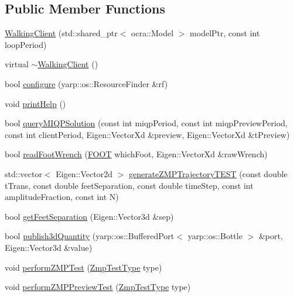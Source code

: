 \subsection*{\-Public \-Member \-Functions}
\begin{DoxyCompactItemize}
\item 
\hyperlink{classWalkingClient_a6c9002a44a54814c4b482739824e39aa}{\-Walking\-Client} (std\-::shared\-\_\-ptr$<$ ocra\-::\-Model $>$ model\-Ptr, const int loop\-Period)
\item 
virtual \hyperlink{classWalkingClient_a1dbc0308f844aea6542750104fddf8e2}{$\sim$\-Walking\-Client} ()
\item 
bool \hyperlink{classWalkingClient_adb8f972f34cb39c69c02a7c3cb493b81}{configure} (yarp\-::os\-::\-Resource\-Finder \&rf)
\item 
void \hyperlink{classWalkingClient_aff3fabef11d9c8b747a422f879c26067}{print\-Help} ()
\item 
bool \hyperlink{classWalkingClient_a06a0f21c6a921687f69f37f622338226}{query\-M\-I\-Q\-P\-Solution} (const int miqp\-Period, const int miqp\-Preview\-Period, const int client\-Period, \-Eigen\-::\-Vector\-Xd \&preview, \-Eigen\-::\-Vector\-Xd \&t\-Preview)
\item 
bool \hyperlink{classWalkingClient_a03ea2313c954a97aeb4d5b614f3e6caa}{read\-Foot\-Wrench} (\hyperlink{utils_8h_a4b6a8e135f90bd56e5a57a60efb42529}{\-F\-O\-O\-T} which\-Foot, \-Eigen\-::\-Vector\-Xd \&raw\-Wrench)
\item 
std\-::vector$<$ \-Eigen\-::\-Vector2d $>$ \hyperlink{classWalkingClient_a3185a8ede8bf8b1227f7dd540ba87e3c}{generate\-Z\-M\-P\-Trajectory\-T\-E\-S\-T} (const double t\-Trans, const double feet\-Separation, const double time\-Step, const int amplitude\-Fraction, const int \-N)
\item 
bool \hyperlink{classWalkingClient_a87e70046251149b4b7aff1dc57b3dcc4}{get\-Feet\-Separation} (\-Eigen\-::\-Vector3d \&sep)
\item 
bool \hyperlink{classWalkingClient_ae6d6c046a9a3e51771afe8b4c105b412}{publish3d\-Quantity} (yarp\-::os\-::\-Buffered\-Port$<$ yarp\-::os\-::\-Bottle $>$ \&port, \-Eigen\-::\-Vector3d \&value)
\item 
void \hyperlink{classWalkingClient_ae3c259f7615c85ce53a413f6e7ab4b76}{perform\-Z\-M\-P\-Test} (\hyperlink{utils_8h_afc01479a47f5a87462a54b6a9e11fffa}{\-Zmp\-Test\-Type} type)
\item 
void \hyperlink{classWalkingClient_a3b1217b7fa17f76f162be0e12e419d96}{perform\-Z\-M\-P\-Preview\-Test} (\hyperlink{utils_8h_afc01479a47f5a87462a54b6a9e11fffa}{\-Zmp\-Test\-Type} type)

\end{DoxyCompactItemize}
